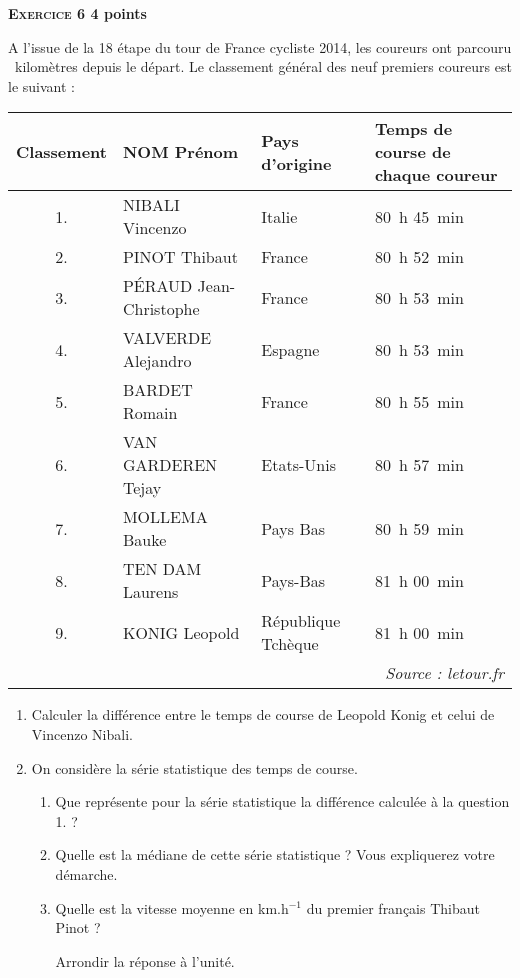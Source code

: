\textbf{\textsc{Exercice 6} \hfill 4 points}

\medskip

A l'issue de la 18 étape du tour de France cycliste 2014, les coureurs ont parcouru
~kilomètres depuis le départ. Le classement général des neuf premiers coureurs est
le suivant :

\begin{center}
\begin{tabularx}{\linewidth}{|c|*{3}{X|}}\hline
Classement	& NOM Prénom		& Pays d'origine	&Temps de course de chaque coureur\\ \hline
1.			& NIBALI Vincenzo	& Italie 			&80~h 45~min\\ \hline
2.			& PINOT Thibaut		& France 			&80~h 52~min\\ \hline
3.			& PÉRAUD Jean-Christophe& France		&80~h 53~min\\ \hline
4.			& VALVERDE Alejandro& Espagne 			&80~h 53~min\\ \hline
5.			& BARDET Romain		& France 			&80~h 55~min\\ \hline
6.			& VAN GARDEREN Tejay& Etats-Unis		&80~h 57~min\\ \hline
7.			& MOLLEMA Bauke		& Pays Bas 			&80~h 59~min\\ \hline
8.			& TEN DAM Laurens	& Pays-Bas 			&81~h 00~min\\ \hline
9.			& KONIG Leopold		& République Tchèque&81~h 00~min\\ \hline
\multicolumn{4}{r}{\emph{Source : letour.fr}}\\
\end{tabularx}
\end{center}

\medskip

\begin{enumerate}
\item Calculer la différence entre le temps de course de Leopold Konig et celui de
Vincenzo Nibali.
\item On considère la série statistique des temps de course.
	\begin{enumerate}
		\item Que représente pour la série statistique la différence calculée à la
question 1. ?
		\item Quelle est la médiane de cette série statistique ? Vous expliquerez votre
démarche.
		\item Quelle est la vitesse moyenne en km.h$^{-1}$ du premier français Thibaut Pinot ?
		
Arrondir la réponse à l'unité.
	\end{enumerate}
\end{enumerate}

\vspace{0,5cm}

